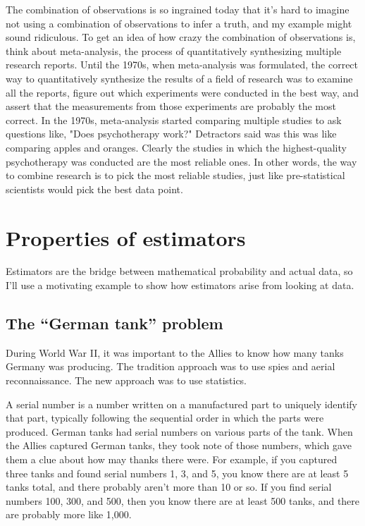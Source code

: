 The combination of observations is so ingrained today that it's hard to imagine
not using a combination of observations to infer a truth, and my example might
sound ridiculous. To get an idea of how crazy the combination of observations
is, think about meta-analysis, the process of quantitatively synthesizing
multiple research reports. Until the 1970s, when meta-analysis was formulated,
the correct way to quantitatively synthesize the results of a field of research
was to examine all the reports, figure out which experiments were conducted in
the best way, and assert that the measurements from those experiments are
probably the most correct. In the 1970s, meta-analysis started comparing
multiple studies to ask questions like, "Does psychotherapy work?" Detractors
said was this was like comparing apples and oranges. Clearly the studies in
which the highest-quality psychotherapy was conducted are the most reliable
ones. In other words, the way to combine research is to pick the most reliable
studies, just like pre-statistical scientists would pick the best data point.

\section{Properties of estimators}

Estimators are the bridge between mathematical probability and actual data, so
I'll use a motivating example to show how estimators arise from looking at data.

\subsection{The ``German tank'' problem}

During World War II, it was important to the Allies to know how many tanks
Germany was producing. The tradition approach was to use spies and aerial
reconnaissance. The new approach was to use statistics.

A serial number is a number written on a manufactured part to uniquely identify
that part, typically following the sequential order in which the parts were
produced. German tanks had serial numbers on various parts of the tank.  When
the Allies captured German tanks, they took note of those numbers, which gave
them a clue about how may thanks there were. For example, if you captured three
tanks and found serial numbers 1, 3, and 5, you know there are at least 5 tanks
total, and there probably aren't more than 10 or so. If you find serial numbers
100, 300, and 500, then you know there are at least 500 tanks, and there are
probably more like 1,000.

